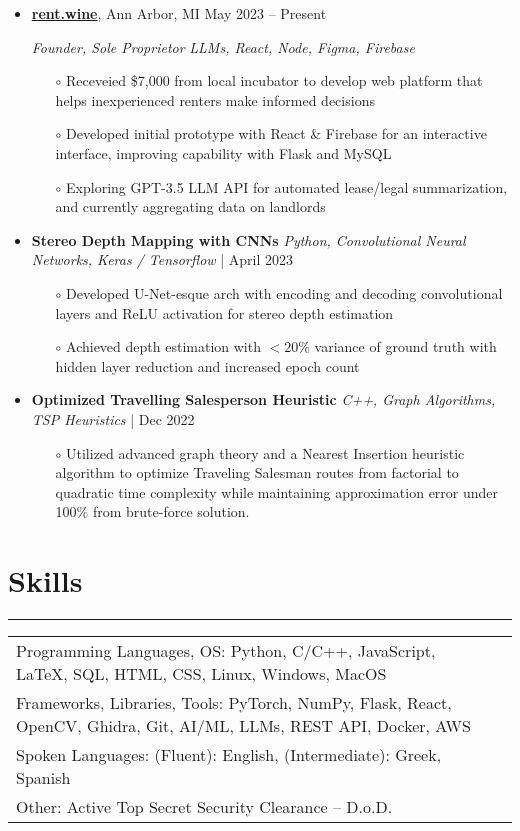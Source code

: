 \documentclass[10pt]{article}
\newcommand{\cussection}[1]{\vspace{-0.3in}\section*{#1}\vspace{-0.15in} \hrule\vspace{0.05in} }
\begin{document}
\begin{itemize}

    \item \href{https://rent.wine/} {\textbf{rent.wine}}, Ann Arbor, MI \hfill May 2023 -- Present

    \textit{Founder, Sole Proprietor}  \hfill \textit{LLMs, React, Node, Figma, Firebase}
    \begin{itemize}[topsep=0pt]   
    \item[$\circ$] Receveied \$7,000 from local incubator to develop web platform that helps inexperienced renters make informed decisions
     \item[$\circ$] Developed initial prototype with React \& Firebase for an interactive interface, improving capability with Flask and MySQL
        \item[$\circ$] Exploring GPT-3.5 LLM API for automated lease/legal summarization, and currently aggregating data on landlords
    \end{itemize}
    \vspace{2pt}

    
    \item \textbf{Stereo Depth Mapping with CNNs} \hfill \textit{Python, Convolutional Neural Networks, Keras / Tensorflow} | April 2023
    \begin{itemize}[topsep=0pt]   
    \item[$\circ$] Developed U-Net-esque arch with encoding and decoding convolutional layers and ReLU activation for stereo depth estimation
    \item[$\circ$] Achieved depth estimation with $<20\%$ variance of ground truth with hidden layer reduction and increased epoch count
    \end{itemize}

    \item \textbf{Optimized Travelling Salesperson Heuristic} \hfill \textit{C++, Graph Algorithms, TSP Heuristics} | Dec 2022
    \begin{itemize}[topsep=0pt]   
    \item[$\circ$] Utilized advanced graph theory and a Nearest Insertion heuristic algorithm to optimize Traveling Salesman routes from factorial to quadratic time complexity while maintaining approximation error under 100\% from brute-force solution.
    \end{itemize}



\end{itemize}
\cussection{Skills}
\vspace{5pt}

\begin{tabular}{ l l }
	Programming Languages, OS: Python, C/C++, JavaScript, LaTeX, SQL, HTML, CSS, Linux, Windows, MacOS \\
	Frameworks, Libraries, Tools: PyTorch, NumPy, Flask, React, OpenCV, Ghidra, Git, AI/ML, LLMs, REST API, Docker, AWS       \\
        Spoken Languages: (Fluent): English, (Intermediate): Greek, Spanish \\
        Other: Active Top Secret Security Clearance -- D.o.D.
\end{tabular}
\end{document}
